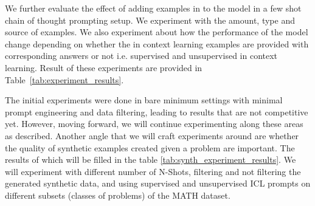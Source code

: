 \documentclass[twocolumn,11pt]{article}
\begin{document}
We further evaluate the effect of adding examples in to the model in a few shot chain of thought prompting setup. We experiment with the amount, type and source of examples. We also experiment about how the performance of the model change depending on whether the in context learning examples are provided with corresponding answers or not i.e. supervised and unsupervised in context learning. Result of these experiments are provided in Table~\ref{tab:experiment_results}.

The initial experiments were done in bare minimum settings with minimal prompt engineering and data filtering, leading to results that are not competitive yet. However, moving forward, we will continue experimenting along these areas as described. Another angle that we will craft experiments around are whether the quality of synthetic examples created given a problem are important. The results of which will be filled in the table \ref{tab:synth_experiment_results}. We will experiment with different number of N-Shots, filtering and not filtering the generated synthetic data, and using supervised and unsupervised ICL prompts on different subsets (classes of problems) of the MATH dataset.




\end{document}
